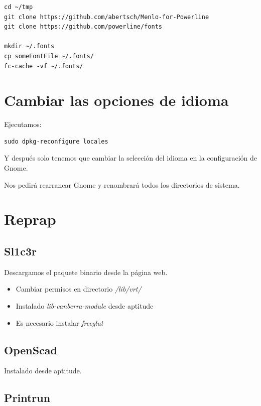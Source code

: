 \documentclass[12pt,spanish,]{article}
\providecommand{\tightlist}{%
  \setlength{\itemsep}{0pt}\setlength{\parskip}{0pt}}
\begin{document}
\begin{verbatim}
cd ~/tmp
git clone https://github.com/abertsch/Menlo-for-Powerline
git clone https://github.com/powerline/fonts

mkdir ~/.fonts
cp someFontFile ~/.fonts/
fc-cache -vf ~/.fonts/
\end{verbatim}

\section{Cambiar las opciones de
idioma}\label{cambiar-las-opciones-de-idioma}

Ejecutamos:

\begin{verbatim}
sudo dpkg-reconfigure locales
\end{verbatim}

Y después solo tenemos que cambiar la selección del idioma en la
configuración de Gnome.

Nos pedirá rearrancar Gnome y renombrará todos los directorios de
sistema.

\section{Reprap}\label{reprap}

\subsection{Sl1c3r}\label{sl1c3r}

Descargamos el paquete binario desde la página web.

\begin{itemize}
\tightlist
\item
  Cambiar permisos en directorio \emph{/lib/vrt/}
\item
  Instalado \emph{lib-canberra-module} desde aptitude
\item
  Es necesario instalar \emph{freeglut}
\end{itemize}

\subsection{OpenScad}\label{openscad}

Instalado desde aptitude.

\subsection{Printrun}\label{printrun}
\end{document}
